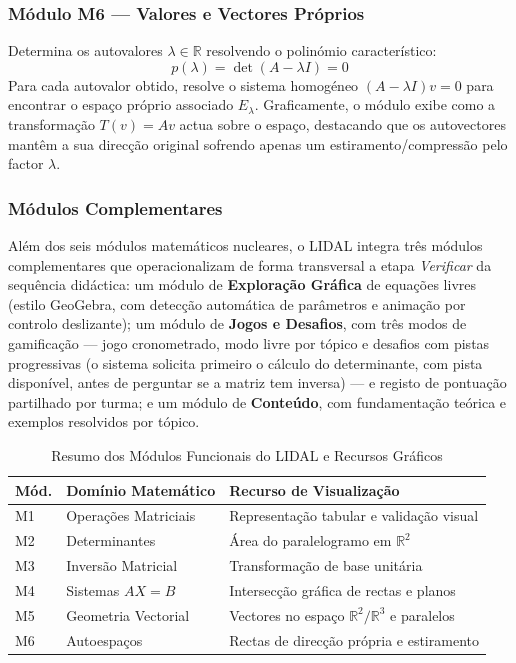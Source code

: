 \documentclass[conference]{IEEEtran}
\begin{document}
\subsubsection{Módulo M6 --- Valores e Vectores Próprios}
Determina os autovalores $\lambda \in \mathbb{R}$ resolvendo o polinómio característico:
\begin{equation}
p(\lambda) = \det(A - \lambda I) = 0
\label{eq:caracteristico}
\end{equation}
Para cada autovalor obtido, resolve o sistema homogéneo $(A-\lambda I)v = 0$ para encontrar o espaço próprio associado $E_\lambda$. Graficamente, o módulo exibe como a transformação $T(v) = Av$ actua sobre o espaço, destacando que os autovectores mantêm a sua direcção original sofrendo apenas um estiramento/compressão pelo factor $\lambda$.

\subsubsection{Módulos Complementares}
\label{sec:modulos-complementares}
Além dos seis módulos matemáticos nucleares, o LIDAL integra três módulos complementares que operacionalizam de forma transversal a etapa \textit{Verificar} da sequência didáctica: um módulo de \textbf{Exploração Gráfica} de equações livres (estilo GeoGebra, com detecção automática de parâmetros e animação por controlo deslizante); um módulo de \textbf{Jogos e Desafios}, com três modos de gamificação --- jogo cronometrado, modo livre por tópico e desafios com pistas progressivas (o sistema solicita primeiro o cálculo do determinante, com pista disponível, antes de perguntar se a matriz tem inversa) --- e registo de pontuação partilhado por turma; e um módulo de \textbf{Conteúdo}, com fundamentação teórica e exemplos resolvidos por tópico.

\begin{table}[htbp]
\caption{Resumo dos Módulos Funcionais do LIDAL e Recursos Gráficos}
\label{tab:modulos}
\centering
\footnotesize
\begin{tabular}{|p{0.5cm}|p{1.9cm}|p{3.6cm}|}
\hline
\textbf{Mód.} & \textbf{Domínio Matemático} & \textbf{Recurso de Visualização} \\
\hline
M1 & Operações Matriciais & Representação tabular e validação visual \\
\hline
M2 & Determinantes & Área do paralelogramo em $\mathbb{R}^2$ \\
\hline
M3 & Inversão Matricial & Transformação de base unitária \\
\hline
M4 & Sistemas $AX=B$ & Intersecção gráfica de rectas e planos \\
\hline
M5 & Geometria Vectorial & Vectores no espaço $\mathbb{R}^2/\mathbb{R}^3$ e paralelos \\
\hline
M6 & Autoespaços & Rectas de direcção própria e estiramento \\
\hline
\end{tabular}
\end{table}
\end{document}
